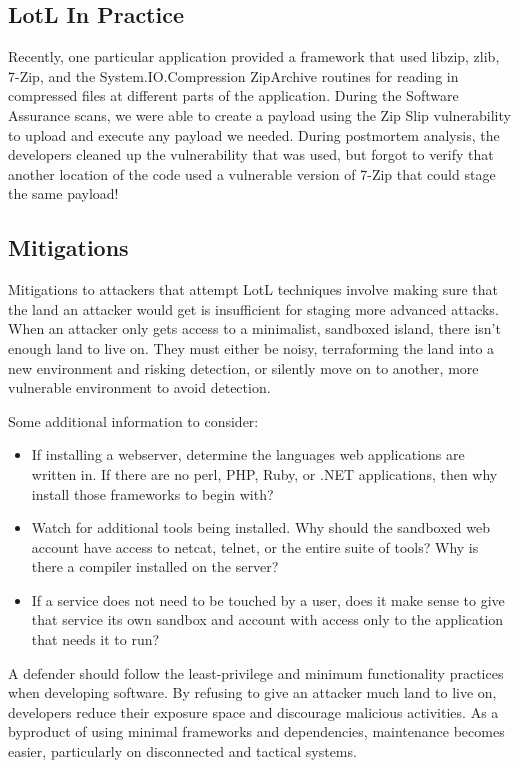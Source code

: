 \subsection{LotL In Practice}

Recently, one particular application provided a framework that used libzip, zlib, 7-Zip, and the System.IO.Compression ZipArchive routines for reading in compressed files at different parts of the application. During the Software Assurance scans, we were able to create a payload using the Zip Slip vulnerability to upload and execute any payload we needed. During postmortem analysis, the developers cleaned up the vulnerability that was used, but forgot to verify that another location of the code used a vulnerable version of 7-Zip that could stage the same payload!

\subsection{Mitigations}

Mitigations to attackers that attempt LotL techniques involve making sure that the land an attacker would get is insufficient for staging more advanced attacks. When an attacker only gets access to a minimalist, sandboxed island, there isn't enough land to live on. They must either be noisy, terraforming the land into a new environment and risking detection, or silently move on to another, more vulnerable environment to avoid detection.

Some additional information to consider:
\begin{itemize}
	\item If installing a webserver, determine the languages web applications are written in. If there are no perl, PHP, Ruby, or .NET applications, then why install those frameworks to begin with?
	\item Watch for additional tools being installed. Why should the sandboxed web account have access to netcat, telnet, or the entire suite of tools? Why is there a compiler installed on the server?
	\item If a service does not need to be touched by a user, does it make sense to give that service its own sandbox and account with access only to the application that needs it to run?
\end{itemize}

A defender should follow the least-privilege and minimum functionality practices when developing software. By refusing to give an attacker much land to live on, developers reduce their exposure space and discourage malicious activities. As a byproduct of using minimal frameworks and dependencies, maintenance becomes easier, particularly on disconnected and tactical systems.

